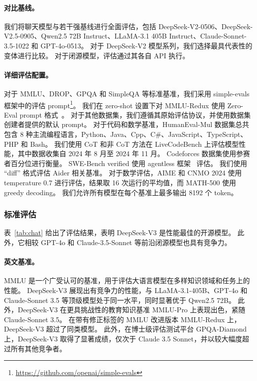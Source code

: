 \documentclass[11pt, a4paper, logo, copyright, nonumbering]{deepseek}
\newcommand{\dsvii}{DeepSeek-V2}
\newcommand{\dsviii}{DeepSeek-V3}
\begin{document}
\paragraph{对比基线。}
我们将聊天模型与若干强基线进行全面评估，包括 \dsvii{}-0506、DeepSeek-V2.5-0905、Qwen2.5 72B Instruct、LLaMA-3.1 405B Instruct、Claude-Sonnet-3.5-1022 和 GPT-4o-0513。
对于 \dsvii{} 模型系列，我们选择最具代表性的变体进行比较。
对于闭源模型，评估通过其各自 API 执行。

\paragraph{详细评估配置。}
对于 MMLU、DROP、GPQA 和 SimpleQA 等标准基准，我们采用 simple-evals 框架中的评估 prompt\footnote{\url{https://github.com/openai/simple-evals}}。
我们在 zero-shot 设置下对 MMLU-Redux 使用 Zero-Eval prompt 格式~\citep{Lin_ZeroEval_A_Unified_2024}。
对于其他数据集，我们遵循其原始评估协议，并使用数据集创建者提供的默认 prompt。
对于代码和数学基准，HumanEval-Mul 数据集总共包含 8 种主流编程语言，Python、Java、Cpp、C\#、JavaScript、TypeScript、PHP 和 Bash。
我们使用 CoT 和非 CoT 方法在 LiveCodeBench 上评估模型性能，其中数据收集自 2024 年 8 月至 2024 年 11 月。
Codeforces 数据集使用参赛者百分位进行衡量。
SWE-Bench verified 使用 agentless 框架~\citep{agentless} 评估。
我们使用 ``diff'' 格式评估 Aider 相关基准。
对于数学评估，AIME 和 CNMO 2024 使用 temperature 0.7 进行评估，结果取 16 次运行的平均值，而 MATH-500 使用 greedy decoding。
我们允许所有模型在每个基准上最多输出 8192 个 token。



\subsubsection{标准评估}

表~\ref{tab:chat} 给出了评估结果，表明 \dsviii{} 是性能最佳的开源模型。
此外，它相较 GPT-4o 和 Claude-3.5-Sonnet 等前沿闭源模型也具有竞争力。

\paragraph{英文基准。}
MMLU 是一个广受认可的基准，用于评估大语言模型在多样知识领域和任务上的性能。
\dsviii{} 展现出有竞争力的性能，与 LLaMA-3.1-405B、GPT-4o 和 Claude-Sonnet 3.5 等顶级模型处于同一水平，同时显著优于 Qwen2.5 72B。
此外，\dsviii{} 在更具挑战性的教育知识基准 MMLU-Pro 上表现出色，紧随 Claude-Sonnet 3.5。
在带有修正标签的 MMLU 改进版本 MMLU-Redux 上，\dsviii{} 超过了同类模型。
此外，在博士级评估测试平台 GPQA-Diamond 上，\dsviii{} 取得了显著成绩，仅次于 Claude 3.5 Sonnet，并以较大幅度超过所有其他竞争者。
\end{document}
